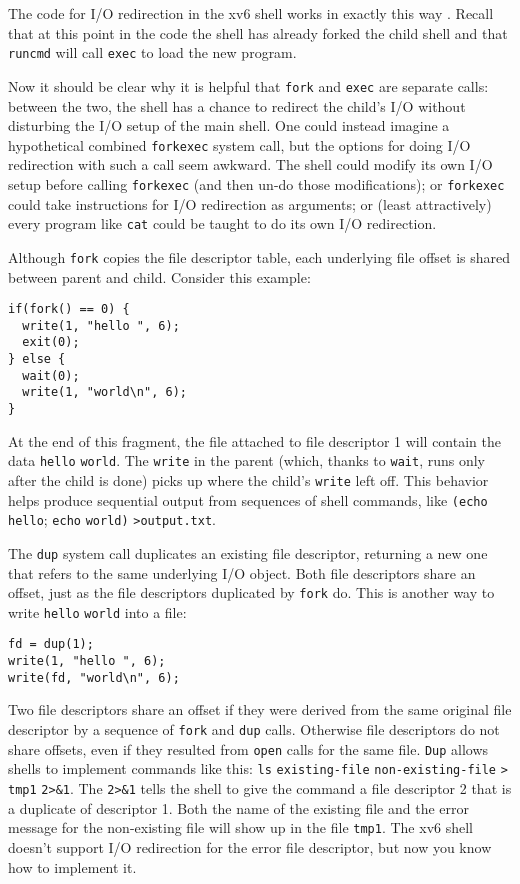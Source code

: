 The code for I/O redirection in the xv6 shell works in exactly this way
.
Recall that at this point in the code the shell has already forked the
child shell and that 
\lstinline{runcmd} 
will call
\lstinline{exec}
to load the new program.

Now it should be clear why it is helpful that
\lstinline{fork}
and 
\lstinline{exec} 
are separate calls: between the two, the shell has a chance
to redirect the child's I/O without disturbing the I/O setup of the main shell.
One could instead imagine a hypothetical combined
\lstinline{forkexec} system call,
but the options for doing I/O redirection with such a call
seem awkward.
The shell could modify its own I/O
setup before calling \lstinline{forkexec} (and then
un-do those modifications); or
\lstinline{forkexec} could take instructions for I/O
redirection as arguments;
or (least attractively) every program like \lstinline{cat} could
be taught to do its own I/O redirection.

Although
\lstinline{fork}
copies the file descriptor table, each underlying file offset is shared
between parent and child.
Consider this example:
\begin{lstlisting}[]
if(fork() == 0) {
  write(1, "hello ", 6);
  exit(0);
} else {
  wait(0);
  write(1, "world\n", 6);
}
\end{lstlisting}
At the end of this fragment, the file attached to file descriptor 1
will contain the data
\lstinline{hello}
\lstinline{world}.
The
\lstinline{write}
in the parent
(which, thanks to
\lstinline{wait},
runs only after the child is done)
picks up where the child's
\lstinline{write}
left off.
This behavior helps produce sequential output from sequences
of shell commands, like
\lstinline{(echo}
\lstinline{hello};
\lstinline{echo}
\lstinline{world)}
\lstinline{>output.txt}.

The
\lstinline{dup}
system call duplicates an existing file descriptor,
returning a new one that refers to the same underlying I/O object.
Both file descriptors share an offset, just as the file descriptors
duplicated by
\lstinline{fork}
do.
This is another way to write
\lstinline{hello}
\lstinline{world}
into a file:
\begin{lstlisting}[]
fd = dup(1);
write(1, "hello ", 6);
write(fd, "world\n", 6);
\end{lstlisting}

Two file descriptors share an offset if they were derived from
the same original file descriptor by a sequence of
\lstinline{fork}
and
\lstinline{dup}
calls.
Otherwise file descriptors do not share offsets, even if they
resulted from 
\lstinline{open}
calls for the same file.  
\lstinline{Dup} 
allows shells to implement commands like this:
\lstinline{ls}
\lstinline{existing-file}
\lstinline{non-existing-file}
\lstinline{>}
\lstinline{tmp1}
\lstinline{2>&1}.
The
\lstinline{2>&1}
tells the shell to give the command a file descriptor 2 that
is a duplicate of descriptor 1.
Both the name of the existing file and the error message for the
non-existing file will show up in the file
\lstinline{tmp1}.
The xv6 shell doesn't support I/O redirection for the error file
descriptor, but now you know how to implement it.

